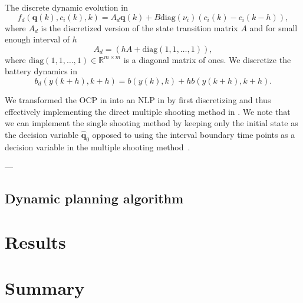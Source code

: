 The discrete dynamic evolution in 
\begin{equation}
  f_d(\mathbf{q}(k),c_i(k),k)=A_d\mathbf{q}(k)+B\mathrm{diag}(\nu_i)(c_i(k)-c_i(k-h)),
\end{equation}
where $A_d$ is the discretized version of the state transition matrix $A$ and for small enough interval of $h$
\begin{equation}
A_d=(hA+\mathrm{diag}(1,1,\dots,1)),
\end{equation}
where $\mathrm{diag}(1,1,\dots,1)\in\mathbb{R}^{m\times m}$ is a diagonal matrix of ones. We discretize the battery dynamics in  
\begin{equation}
  b_d(y(k+h),k+h)=b(y(k),k)+hb(y(k+h),k+h).
\end{equation}

We transformed the OCP in  into an NLP in  by first discretizing and thus effectively implementing the direct multiple shooting method in . We note that we can implement the single shooting method by keeping only the initial state as the decision variable $\hat{\mathbf{q}}_0$ opposed to 
using the interval boundary time points as a decision variable in the multiple shooting method~\citep{rawlings2017model}.


---

\subsection{\color{cyan}Dynamic planning algorithm}
\label{sec:algo}

\section{\color{red}Results}


\section{\color{red}Summary}

